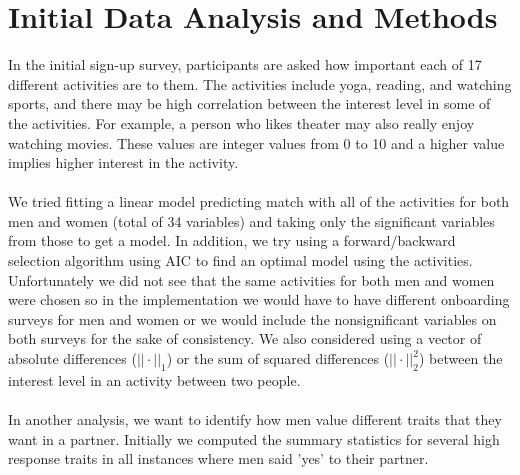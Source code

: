 \documentclass{article}
\begin{document}
\section{Initial Data Analysis and Methods}
In the initial sign-up survey, participants are asked how important each of 17 different activities are to them.  The activities include yoga, reading, and watching sports, and there may be high correlation between the interest level in some of the activities.  For example, a person who likes theater may also really enjoy watching movies.  These values are integer values from 0 to 10 and a higher value implies higher interest in the activity. \\ %
\null\\
We tried fitting a linear model predicting match with all of the activities for both men and women (total of 34 variables) and taking only the significant variables from those to get a model.  In addition, we try using a forward/backward selection algorithm using AIC to find an optimal model using the activities.  Unfortunately we did not see that the same activities for both men and women were chosen so in the implementation we would have to have different onboarding surveys for men and women or we would include the nonsignificant variables on both surveys for the sake of consistency.  We also considered using a vector of absolute differences ($||\cdot||_1$) or the sum of squared differences ($||\cdot||_2^2$) between the interest level in an activity between two people. \\
\null\\
In another analysis, we want to identify how men value different traits that they want in a partner. Initially we computed the summary statistics for several high response traits in all instances where men said 'yes' to their partner. 
\end{document}
